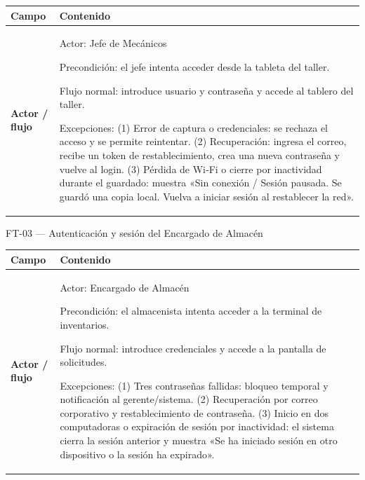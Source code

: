 {\def\LTcaptype{none} %
\begin{longtable}[]{@{}
  >{\raggedright\arraybackslash}p{}
  >{\raggedright\arraybackslash}p{}@{}}
\toprule\noalign{}
\begin{minipage}[b]{\linewidth}\raggedright
\textbf{Campo}
\end{minipage} & \begin{minipage}[b]{\linewidth}\raggedright
\textbf{Contenido}
\end{minipage} \\
\midrule\noalign{}
\endhead
\bottomrule\noalign{}
\endlastfoot
\textbf{Actor / flujo} & Actor: Jefe de Mecánicos

Precondición: el jefe intenta acceder desde la tableta del taller.

Flujo normal: introduce usuario y contraseña y accede al tablero del
taller.

Excepciones: (1) Error de captura o credenciales: se rechaza el acceso y
se permite reintentar. (2) Recuperación: ingresa el correo, recibe un
token de restablecimiento, crea una nueva contraseña y vuelve al login.
(3) Pérdida de Wi‑Fi o cierre por inactividad durante el guardado:
muestra «Sin conexión / Sesión pausada. Se guardó una copia local.
Vuelva a iniciar sesión al restablecer la red». \\
\end{longtable}
}

FT-03 --- Autenticación y sesión del Encargado de Almacén

{\def\LTcaptype{none} %
\begin{longtable}[]{@{}
  >{\raggedright\arraybackslash}p{}
  >{\raggedright\arraybackslash}p{}@{}}
\toprule\noalign{}
\begin{minipage}[b]{\linewidth}\raggedright
\textbf{Campo}
\end{minipage} & \begin{minipage}[b]{\linewidth}\raggedright
\textbf{Contenido}
\end{minipage} \\
\midrule\noalign{}
\endhead
\bottomrule\noalign{}
\endlastfoot
\textbf{Actor / flujo} & Actor: Encargado de Almacén

Precondición: el almacenista intenta acceder a la terminal de
inventarios.

Flujo normal: introduce credenciales y accede a la pantalla de
solicitudes.

Excepciones: (1) Tres contraseñas fallidas: bloqueo temporal y
notificación al gerente/sistema. (2) Recuperación por correo corporativo
y restablecimiento de contraseña. (3) Inicio en dos computadoras o
expiración de sesión por inactividad: el sistema cierra la sesión
anterior y muestra «Se ha iniciado sesión en otro dispositivo o la
sesión ha expirado». \\
\end{longtable}
}

